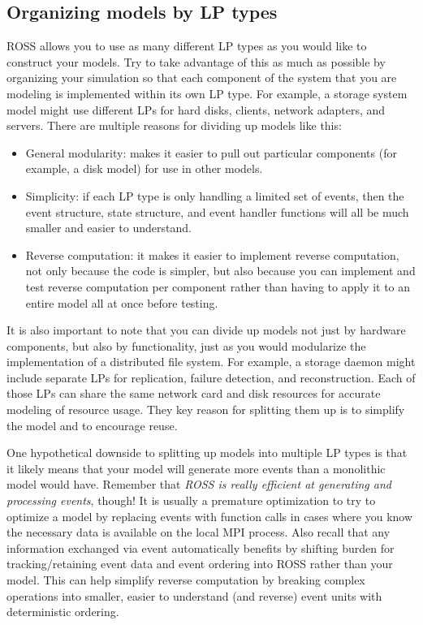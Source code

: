 \documentclass[conference,10pt,compsocconf,onecolumn]{IEEEtran}
\begin{document}
\subsection{Organizing models by LP types}

ROSS allows you to use as many different LP types as you would like to
construct your models.  Try to take advantage of this as much as possible by
organizing your simulation so that each component of the system that you are
modeling is implemented within its own LP type.  For example, a storage
system model might use different LPs for hard disks, clients, network
adapters, and servers.  There are multiple reasons for dividing up models
like this:

\begin{itemize}
\item General modularity: makes it easier to pull out particular components
(for example, a disk model) for use in other models.
\item Simplicity: if each LP type is only handling a limited set of
events, then the event structure, state structure, and event handler
functions will all be much smaller and easier to understand.
\item Reverse computation: it makes it easier to implement reverse
computation, not only because the code is simpler, but also because you can
implement and test reverse computation per component rather than having to
apply it to an entire model all at once before testing.
\end{itemize}

It is also important to note that you can divide up models not just by
hardware components, but also by functionality, just as
you would modularize the implementation of a distributed file system.  For
example, a storage daemon might include separate LPs for replication, failure
detection, and reconstruction.  Each of those LPs can share the same network
card and disk resources for accurate modeling of resource usage.  They key
reason for splitting them up is to simplify the model and to encourage
reuse.

One hypothetical downside to splitting up models into multiple LP types is that it likely
means that your model will generate more events than a monolithic model
would have.  Remember that \emph{ROSS is really efficient at generating and
processing events}, though!  It is usually a premature optimization to try to optimize a model by
replacing events with function calls in cases where you know the necessary
data is available on the local MPI process.  Also recall that any information
exchanged via event automatically benefits by shifting burden for
tracking/retaining event data and event ordering into ROSS rather than your
model.  This can help simplify reverse computation by breaking complex
operations into smaller, easier to understand (and reverse) event units with
deterministic ordering.
\end{document}
